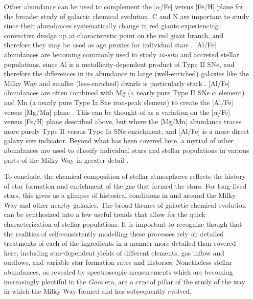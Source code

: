 Other abundance can be used to complement the [$\alpha$/Fe] versus [Fe/H] plane for the broader study of galactic chemical evolution. C and N are important to study since their abundances systematically change in red giants experiencing convective dredge up at characteristic point on the red giant branch, and therefore they may be used as age proxies for individual stars \parencite[e.g.][]{mackereth19a}. [Al/Fe] abundances are becoming commonly used to study \textit{in-situ} and accreted stellar populations, since Al is a metallicity-dependent product of Type II SNe, and therefore the differences in its abundance in large (well-enriched) galaxies like the Milky Way and smaller (less-enriched) dwarfs is particularly stark \parencite[e.g.][]{hawkins15,das20,belokurov22}. [Al/Fe] abundances are often combined with Mg (a nearly pure Type II SNe $\alpha$ element) and Mn (a nearly pure Type Ia Sne iron-peak element) to create the [Al/Fe] versus [Mg/Mn] plane \parencite[e.g.][]{hawkins15,das20,horta21a,fernandez23}. This can be thought of as a variation on the [$\alpha$/Fe] versus [Fe/H] plane described above, but where the [Mg/Mn] abundance traces more purely Type II versus Type Ia SNe enrichment, and [Al/Fe] is a more direct galaxy size indicator. Beyond what has been covered here, a myriad of other abundances are used to classify individual stars and stellar populations in various parts of the Milky Way in greater detail \parencite[e.g. see][]{frebel15,barbuy18}. 

To conclude, the chemical composition of stellar atmospheres reflects the history of star formation and enrichment of the gas that formed the stars. For long-lived stars, this gives us a glimpse of historical conditions in and around the Milky Way and other nearby galaxies. The broad themes of galactic chemical evolution can be synthesized into a few useful trends that allow for the quick characterization of stellar populations. It is important to recognize though that the realities of self-consistently modelling these processes rely on detailed treatments of each of the ingredients in a manner more detailed than covered here, including star-dependent yields of different elements, gas inflow and outflows, and variable star formation rates and histories. Nonetheless stellar abundances, as revealed by spectroscopic measurements which are becoming increasingly plentiful in the \textit{Gaia} era, are a crucial pillar of the study of the way in which the Milky Way formed and has subsequently evolved.

